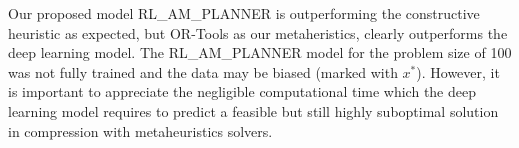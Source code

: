 \begin{table}[ht]
\centering
{}
\caption{Benchmarking of VRPTW solvers for problem size of 100 nodes.}
\label{tab:result-100}
\end{table} 

Our proposed model RL\_AM\_PLANNER is outperforming the constructive heuristic as expected, but OR-Tools as our metaheristics, clearly outperforms the deep learning model. The RL\_AM\_PLANNER model for the problem size of 100 was not fully trained and the data may be biased (marked with $x^*$). However, it is important to appreciate the negligible computational time which the deep learning model requires to predict a feasible but still highly suboptimal solution in compression with metaheuristics solvers.
